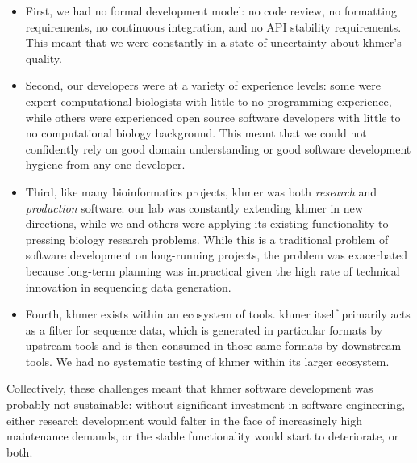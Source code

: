\documentclass[11pt]{article}
\begin{document}
\begin{itemize}
\item First, we had no formal development model: no code review, no
  formatting requirements, no continuous integration, and no API
  stability requirements.  This meant that we were constantly in a
  state of uncertainty about khmer's quality.

\item Second, our developers were at a variety of experience levels:
  some were expert computational biologists with little to no
  programming experience, while others were experienced open source
  software developers with little to no computational biology
  background.  This meant that we could not confidently rely on good
  domain understanding or good software development hygiene from any
  one developer.

\item Third, like many bioinformatics projects, khmer was both {\em
  research} and {\em production} software: our lab was constantly
  extending khmer in new directions, while we and others were applying
  its existing functionality to pressing biology research problems.
  While this is a traditional problem of software development on
  long-running projects, the problem was exacerbated because long-term
  planning was impractical given the high rate of technical innovation
  in sequencing data generation.

\item Fourth, khmer exists within an ecosystem of tools.  khmer itself
  primarily acts as a filter for sequence data, which is generated in
  particular formats by upstream tools and is then consumed in those
  same formats by downstream tools.  We had no systematic testing of khmer
  within its larger ecosystem.

\end{itemize}

Collectively, these challenges meant that khmer software development
was probably not sustainable: without significant investment in
software engineering, either research development would falter in the
face of increasingly high maintenance demands, or the stable
functionality would start to deteriorate, or both.

\end{document}
